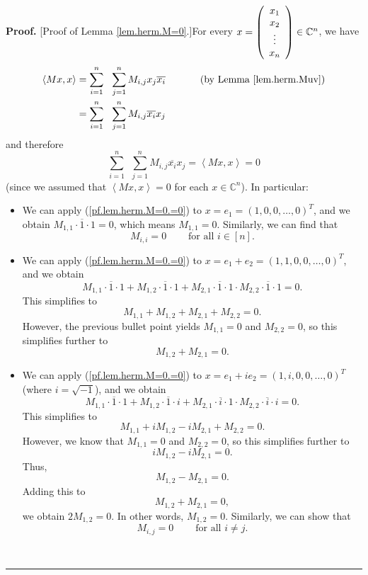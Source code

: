 \documentclass[numbers=enddot,12pt,final,onecolumn,notitlepage]{scrartcl}%
\numberwithin{exer}{subsection}
\theoremstyle{definition}
\newenvironment{proof}[1][Proof]{\noindent\textbf{#1.} }{\ \rule{0.5em}{0.5em}}
\let\sumnonlimits\sum
\renewcommand{\sum}{\sumnonlimits\limits}
\begin{document}
\begin{proof}
[Proof of Lemma \ref{lem.herm.M=0}.]For every $x=\left(
\begin{array}
[c]{c}%
x_{1}\\
x_{2}\\
\vdots\\
x_{n}%
\end{array}
\right)  \in\mathbb{C}^{n}$, we have%
\begin{align*}
\left\langle Mx,x\right\rangle  &  =\sum_{i=1}^{n}\ \ \sum_{j=1}^{n}%
M_{i,j}x_{j}\overline{x_{i}}\ \ \ \ \ \ \ \ \ \ \left(  \text{by Lemma
\ref{lem.herm.Muv}}\right) \\
&  =\sum_{i=1}^{n}\ \ \sum_{j=1}^{n}M_{i,j}\overline{x_{i}}x_{j}%
\end{align*}
and therefore%
\begin{equation}
\sum_{i=1}^{n}\ \ \sum_{j=1}^{n}M_{i,j}\overline{x_{i}}x_{j}=\left\langle
Mx,x\right\rangle =0 \label{pf.lem.herm.M=0.=0}%
\end{equation}
(since we assumed that $\left\langle Mx,x\right\rangle =0$ for each
$x\in\mathbb{C}^{n}$). In particular:

\begin{itemize}
\item We can apply (\ref{pf.lem.herm.M=0.=0}) to $x=e_{1}=\left(
1,0,0,\ldots,0\right)  ^{T}$, and we obtain $M_{1,1}\cdot\overline{1}\cdot
1=0$, which means $M_{1,1}=0$. Similarly, we can find that%
\begin{equation}
M_{i,i}=0\ \ \ \ \ \ \ \ \ \ \text{for all }i\in\left[  n\right]  .
\label{pf.lem.herm.M=0.Mii=0}%
\end{equation}


\item We can apply (\ref{pf.lem.herm.M=0.=0}) to $x=e_{1}+e_{2}=\left(
1,1,0,0,\ldots,0\right)  ^{T}$, and we obtain
\[
M_{1,1}\cdot\overline{1}\cdot1+M_{1,2}\cdot\overline{1}\cdot1+M_{2,1}%
\cdot\overline{1}\cdot1\cdot M_{2,2}\cdot\overline{1}\cdot1=0.
\]
This simplifies to%
\[
M_{1,1}+M_{1,2}+M_{2,1}+M_{2,2}=0.
\]
However, the previous bullet point yields $M_{1,1}=0$ and $M_{2,2}=0$, so this
simplifies further to%
\[
M_{1,2}+M_{2,1}=0.
\]


\item We can apply (\ref{pf.lem.herm.M=0.=0}) to $x=e_{1}+ie_{2}=\left(
1,i,0,0,\ldots,0\right)  ^{T}$ (where $i=\sqrt{-1}$), and we obtain
\[
M_{1,1}\cdot\overline{1}\cdot1+M_{1,2}\cdot\overline{1}\cdot i+M_{2,1}%
\cdot\overline{i}\cdot1\cdot M_{2,2}\cdot\overline{i}\cdot i=0.
\]
This simplifies to%
\[
M_{1,1}+iM_{1,2}-iM_{2,1}+M_{2,2}=0.
\]
However, we know that $M_{1,1}=0$ and $M_{2,2}=0$, so this simplifies further
to%
\[
iM_{1,2}-iM_{2,1}=0.
\]
Thus,
\[
M_{1,2}-M_{2,1}=0.
\]
Adding this to%
\[
M_{1,2}+M_{2,1}=0,
\]
we obtain $2M_{1,2}=0$. In other words, $M_{1,2}=0$. Similarly, we can show
that%
\begin{equation}
M_{i,j}=0\ \ \ \ \ \ \ \ \ \ \text{for all }i\neq j.
\label{pf.lem.herm.M=0.Mij=0}%
\end{equation}


\end{itemize}
\end{proof}
\end{document}
